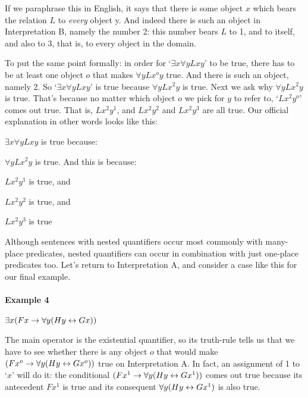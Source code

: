 \noindent If we paraphrase this in English, it says that there is some object $x$ which bears the relation $L$ to \emph{every} object y.  And indeed there is such an object in  Interpretation B, namely the number 2: this number bears $L$ to 1, and to itself, and also to 3, that is, to every object in the domain.

To put the same point formally: in   order for `$\exists x\forall yLxy$' to be true, there has to be at least one object $o$ that makes $\forall yLx^oy$ true.  And there is such an object, namely 2.  So `$\exists x\forall yLxy$' is true because $\forall yLx^2y$  is true.  Next we ask why $\forall yLx^2y$ is true.  That's because no matter which object $o$ we pick for $y$ to refer to, `$Lx^2y^o$' comes out true.  That is, $Lx^2y^1$, and $Lx^2y^2$ and $Lx^2y^3$ are all true. Our official explanation in other words looks like this:

\begin{etriangle}
\item $\exists x\forall yLxy$ is true because:
\begin{etriangle}
\item $\forall yLx^2y$ is true.  And this is because:
\begin{etriangle}
\item $Lx^2y^1$ is true, and
\item $Lx^2y^2$ is true, and
\item $Lx^2y^3$ is true
\end{etriangle}
\end{etriangle}
\end{etriangle}

Although sentences with nested quantifiers occur most commonly with many-place predicates, nested quantifiers can occur in combination with just one-place predicates too.  Let's return to Interpretation A, and consider a case like this for our final example.

\paragraph{Example 4} $\exists x(Fx \rightarrow \forall y(Hy \leftrightarrow Gx))$

\noindent The main operator is the existential quantifier, so its truth-rule tells us that we have to see whether there is any object $o$ that would make $(Fx^o \rightarrow \forall y(Hy \leftrightarrow Gx^o))$ true on Interpretation A.  In fact, an assignment of 1 to `$x$' will do it: the conditional $(Fx^1 \rightarrow \forall y(Hy \leftrightarrow Gx^1))$ comes out true because its antecedent $Fx^1$ is true and its consequent $\forall y(Hy \leftrightarrow Gx^1)$ is also true.


